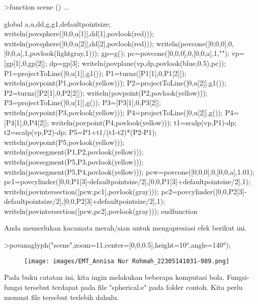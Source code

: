 \documentclass[a4paper,10pt]{article}
\begin{document}
\begin{eulernotebook}
\begin{eulercomment}
\begin{eulercomment}
\begin{eulercomment}
\begin{eulercomment}
\begin{eulercomment}
\end{eulercomment}
\begin{eulerprompt}
>function scene () ...
\end{eulerprompt}
\begin{eulerudf}
  global a,u,dd,g,g1,defaultpointsize;
  writeln(povsphere([0,0,u[1]],dd[1],povlook(red)));
  writeln(povsphere([0,0,u[2]],dd[2],povlook(red)));
  writeln(povcone([0,0,0],0,[0,0,a],1,povlook(lightgray,1)));
  gp=g();
  pc=povcone([0,0,0],0,[0,0,a],1,"");
  vp=[gp[1],0,gp[2]]; dp=gp[3];
  writeln(povplane(vp,dp,povlook(blue,0.5),pc));
  P1=projectToLine([0,u[1]],g1()); P1=turnz([P1[1],0,P1[2]]);
  writeln(povpoint(P1,povlook(yellow)));
  P2=projectToLine([0,u[2]],g1()); P2=turnz([P2[1],0,P2[2]]);
  writeln(povpoint(P2,povlook(yellow)));
  P3=projectToLine([0,u[1]],g()); P3=[P3[1],0,P3[2]];
  writeln(povpoint(P3,povlook(yellow)));
  P4=projectToLine([0,u[2]],g()); P4=[P4[1],0,P4[2]];
  writeln(povpoint(P4,povlook(yellow)));
  t1=scalp(vp,P1)-dp; t2=scalp(vp,P2)-dp; P5=P1+t1/(t1-t2)*(P2-P1);
  writeln(povpoint(P5,povlook(yellow)));
  writeln(povsegment(P1,P2,povlook(yellow)));
  writeln(povsegment(P5,P3,povlook(yellow)));
  writeln(povsegment(P5,P4,povlook(yellow)));
  pcw=povcone([0,0,0],0,[0,0,a],1.01);
  pc1=povcylinder([0,0,P1[3]-defaultpointsize/2],[0,0,P1[3]+defaultpointsize/2],1);
  writeln(povintersection([pcw,pc1],povlook(gray)));
  pc2=povcylinder([0,0,P2[3]-defaultpointsize/2],[0,0,P2[3]+defaultpointsize/2],1);
  writeln(povintersection([pcw,pc2],povlook(gray)));
  endfunction
\end{eulerudf}
\begin{eulercomment}
Anda memerlukan kacamata merah/sian untuk mengapresiasi efek berikut
ini.
\end{eulercomment}
\begin{eulerprompt}
>povanaglyph("scene",zoom=11,center=[0,0,0.5],height=10°,angle=140°);
\end{eulerprompt}
\begin{figure}[h]
    \centering
    \texttt{[image: images/EMT\_Annisa Nur Rohmah\_22305141031-989.png]}
\end{figure}
\begin{eulercomment}
Pada buku catatan ini, kita ingin melakukan beberapa komputasi bola.
Fungsi-fungsi tersebut terdapat pada file "spherical.e" pada folder
contoh. Kita perlu memuat file tersebut terlebih dahulu.
\end{eulercomment}
\begin{eulerprompt}

\end{eulerprompt}
\end{eulercomment}
\end{eulercomment}
\end{eulercomment}
\end{eulercomment}
\end{eulernotebook}
\end{document}
